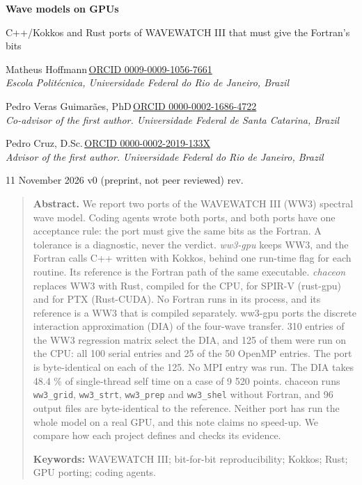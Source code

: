 \documentclass[10pt,a4paper,]{article}
\newcommand{\revision}{\IfFileExists{.current-revision}{}{unversioned}}
\begin{document}
\begin{center}
{\LARGE\bfseries Wave models on GPUs\par}
\vspace{4pt}
{\large C++/Kokkos and Rust ports of WAVEWATCH III that must give the
Fortran's bits\par}
\vspace{12pt}
{\large Matheus
Hoffmann}\,\href{https://orcid.org/0009-0009-1056-7661}{\footnotesize\color{fabric}ORCID 0009-0009-1056-7661}\\
{\small\itshape Escola Politécnica, Universidade Federal do Rio de
Janeiro, Brazil}\par\vspace{4pt}
{\large Pedro Veras Guimarães,
PhD}\,\href{https://orcid.org/0000-0002-1686-4722}{\footnotesize\color{fabric}ORCID 0000-0002-1686-4722}\\
{\small\itshape Co-advisor of the first author. Universidade Federal de
Santa Catarina, Brazil}\par\vspace{4pt}
{\large Pedro Cruz,
D.Sc.}\,\href{https://orcid.org/0000-0002-2019-133X}{\footnotesize\color{fabric}ORCID 0000-0002-2019-133X}\\
{\small\itshape Advisor of the first author. Universidade Federal do Rio
de Janeiro, Brazil}\par\vspace{4pt}
\vspace{6pt}
{\small 11 November 2026 \textperiodcentered{} v0 (preprint, not peer
reviewed) \textperiodcentered{} rev.~\revision\par}
\end{center}

\begin{quote}
\small\textbf{Abstract.} We report two ports of the WAVEWATCH III (WW3)
spectral wave model. Coding agents wrote both ports, and both ports have
one acceptance rule: the port must give the same bits as the Fortran. A
tolerance is a diagnostic, never the verdict. \emph{ww3-gpu} keeps WW3,
and the Fortran calls C++ written with Kokkos, behind one run-time flag
for each routine. Its reference is the Fortran path of the same
executable. \emph{chaceon} replaces WW3 with Rust, compiled for the CPU,
for SPIR-V (rust-gpu) and for PTX (Rust-CUDA). No Fortran runs in its
process, and its reference is a WW3 that is compiled separately. ww3-gpu
ports the discrete interaction approximation (DIA) of the four-wave
transfer. 310 entries of the WW3 regression matrix select the DIA, and
125 of them were run on the CPU: all 100 serial entries and 25 of the 50
OpenMP entries. The port is byte-identical on each of the 125. No MPI
entry was run. The DIA takes 48.4 \% of single-thread self time on a
case of 9 520 points. chaceon runs \texttt{ww3\_grid},
\texttt{ww3\_strt}, \texttt{ww3\_prep} and \texttt{ww3\_shel} without
Fortran, and 96 output files are byte-identical to the reference.
Neither port has run the whole model on a real GPU, and this note claims
no speed-up. We compare how each project defines and checks its
evidence.

\textbf{Keywords:} WAVEWATCH III; bit-for-bit
reproducibility; Kokkos; Rust; GPU porting; coding agents.
\end{quote}
\end{document}
